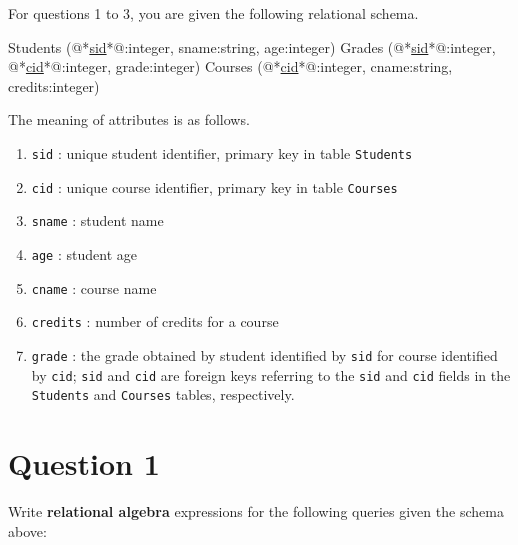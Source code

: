 
For questions 1 to 3, you are given the following relational schema.

\begin{terminal}
Students (@*\underline{sid}*@:integer, sname:string, age:integer)
Grades (@*\underline{sid}*@:integer, @*\underline{cid}*@:integer, grade:integer)
Courses (@*\underline{cid}*@:integer, cname:string, credits:integer)
\end{terminal}

The meaning of attributes is as follows.

\begin{enumerate}[topsep=0pt,itemsep=0ex,partopsep=5pt,parsep=0pt,label=-]
\item \texttt{sid} : unique student identifier, primary key in table \texttt{Students}
\item \texttt{cid} : unique course identifier, primary key in table \texttt{Courses}
\item \texttt{sname} : student name
\item \texttt{age} : student age
\item \texttt{cname} : course name
\item \texttt{credits} : number of credits for a course
\item \texttt{grade} : the grade obtained by student identified by \texttt{sid} for course identified by \texttt{cid}; \texttt{sid} and \texttt{cid} are foreign keys referring to the \texttt{sid} and \texttt{cid} fields in the \texttt{Students} and \texttt{Courses} tables, respectively.
\end{enumerate}

\section*{Question 1}

Write \textbf{relational algebra} expressions for the following queries given the schema above:

